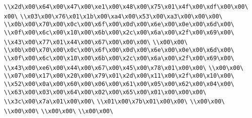 \verb|\\x2d\x00\x64\x00\x47\x00\xe1\x00\x48\x00\x75\x01\x4f\x00\xdf\x00\x00\x00\|\newline
\verb|\\x03\x00\x76\x01\x1b\x00\xa4\x00\x53\x00\xa3\x00\x00\x00\|\newline
\verb|\\x0b\x00\x70\x00\x0c\x00\x6f\x00\x0d\x00\x6e\x00\x0e\x00\x6d\x00\|\newline
\verb|\\x0f\x00\x6c\x00\x10\x00\x6b\x00\x2c\x00\x6a\x00\x2f\x00\x69\x00\|\newline
\verb|\\x43\x00\x77\x01\x44\x00\x67\x00\x00\x00\|\newline
\verb|\\x00\x00\|\newline
\verb|\\x0b\x00\x70\x00\x0c\x00\x6f\x00\x0d\x00\x6e\x00\x0e\x00\x6d\x00\|\newline
\verb|\\x0f\x00\x6c\x00\x10\x00\x6b\x00\x2c\x00\x6a\x00\x2f\x00\x69\x00\|\newline
\verb|\\x43\x00\xe6\x00\x44\x00\x67\x00\x45\x00\x78\x01\x00\x00\|\newline
\verb|\\x00\x00\|\newline
\verb|\\x07\x00\x17\x00\x20\x00\x79\x01\x2d\x00\x11\x00\x2f\x00\x10\x00\|\newline
\verb|\\x52\x00\x0a\x00\x60\x00\x06\x00\x61\x00\x05\x00\x62\x00\x04\x00\|\newline
\verb|\\x63\x00\x03\x00\x64\x00\x02\x00\x65\x00\x01\x00\x00\x00\|\newline
\verb|\\x3c\x00\x7a\x01\x00\x00\|\newline
\verb|\\x01\x00\x7b\x01\x00\x00\|\newline
\verb|\\x00\x00\|\newline
\verb|\\x00\x00\|\newline
\verb|\\x00\x00\|\newline
\verb|\\x00\x00\|\newline

